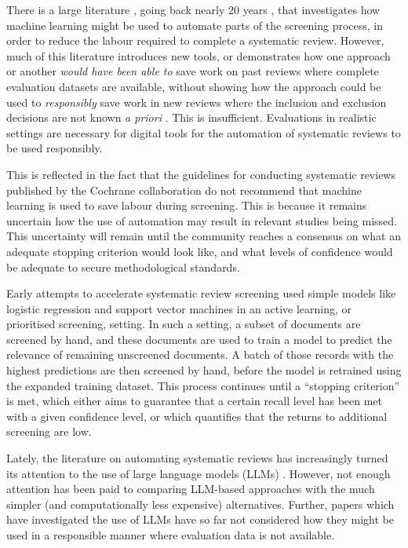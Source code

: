 \documentclass{article}
\begin{document}
	There is a large literature \cite{omara-eves_using_2015}, going back nearly 20 years \cite{cohen_reducing_2006}, that investigates how machine learning might be used to automate parts of the screening process, in order to reduce the labour required to complete a systematic review. However, much of this literature introduces new tools, or demonstrates how one approach or another \textit{would have been able to} save work on past reviews where complete evaluation datasets are available, without showing how the approach could be used to \textit{responsibly} save work in new reviews where the inclusion and exclusion decisions are not known \textit{a priori}  \cite{van_de_schoot_open_2021, rathbone_faster_2015, yang_goldilocks_2022}. This is insufficient. Evaluations in realistic settings are necessary for digital tools for the automation of systematic reviews to be used responsibly. 
	
	This is reflected in the fact that the guidelines for conducting systematic reviews published by the Cochrane collaboration \cite{lefebvre_chapter_2023} do not recommend that machine learning is used to save labour during screening. This is because it remains uncertain how the use of automation may result in relevant studies being missed. This uncertainty will remain until the community reaches a consensus on what an adequate stopping criterion would look like, and what levels of confidence would be adequate to secure methodological standards.
	
	Early attempts to accelerate systematic review screening used simple models like logistic regression and support vector machines \cite{cohen_reducing_2006} in an active learning, or prioritised screening, setting. In such a setting, a subset of documents are screened by hand, and these documents are used to train a model to predict the relevance of remaining unscreened documents. A batch of those records with the highest predictions are then screened by hand, before the model is retrained using the expanded training dataset. This process continues until a ``stopping criterion'' \cite{SneydS19, callaghan_statistical_2020, lewis_confidence_2023} is met, which either aims to guarantee that a certain recall level has been met with a given confidence level, or which quantifies that the returns to additional screening are low. 
 
 Lately, the literature on automating systematic reviews has increasingly turned its attention to the use of large language models (LLMs) \cite{oami_performance_2024, wang_zero-shot_2024, luo_evaluating_2024, xia_llmscreen_2024}. However, not enough attention has been paid to comparing LLM-based approaches with the much simpler (and computationally less expensive) alternatives. Further, papers which have investigated the use of LLMs have so far not considered how they might be used in a responsible manner where evaluation data is not available.
	
\end{document}

